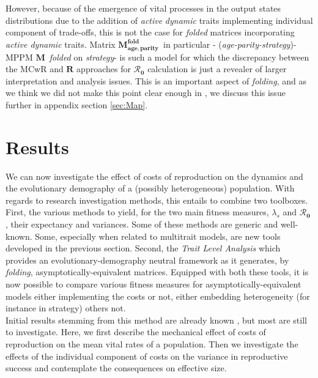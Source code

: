 \documentclass[10pt,a4paper]{article}
\newcommand{\M}{$\mathbf{M}$}
\newcommand{\Rzero}{$\boldsymbol{\mathcal{R}_{0}}$  }
\newcommand{\Map}{$\mathbf{M^{fold}_{age,parity}}$}
\begin{document}
However, because of the emergence of vital processes in the output states distributions due to the addition of \emph{active} \emph{dynamic} traits implementing individual component of trade-offs, this is not the case for \emph{folded} matrices incorporating \emph{active dynamic} traits. Matrix \Map\ in particular - (\emph{age-parity-strategy})-MPPM \M\ \emph{folded} on \emph{strategy}- is such a model for which the discrepancy between the MCwR and $\mathbf{R}$ approaches for \Rzero calculation is just a revealer of larger interpretation and analysis issues. This is an important aspect of \emph{folding}, and as we think we did not make this point clear enough in \citep{Coste2017}, we discuss this issue further in appendix section \ref{sec:Map}. 
 






\section{Results}

We can now investigate the effect of costs of reproduction on the dynamics and the evolutionary demography of a (possibly heterogeneous) population.
With regards to research investigation methods, this entails to combine two toolboxes. First, the various methods to yield, for the two main fitness measures, $\lambda_{s}$ and \Rzero, their expectancy and variances. Some of these methods are generic and well-known. Some, especially when related to multitrait models, are new tools developed in the previous section. Second, the \emph{Trait Level Analysis} which provides an evolutionary-demography neutral framework as it generates, by \emph{folding}, asymptotically-equivalent matrices. Equipped with both these tools, it is now possible to compare various fitness measures for asymptotically-equivalent models either implementing the costs or not, either embedding heterogeneity (for instance in strategy) others not.\\


Initial results stemming from this method are already known \citep[see for instance the reducing effects of individual costs of reproduction on selection gradients in][]{Coste2017}, but most are still to investigate. Here, we first describe the mechanical effect of costs of reproduction on the mean vital rates of a population.%
Then we investigate the effects of the individual component of costs on the variance in reproductive success and contemplate the consequences on effective size. 
\end{document}
